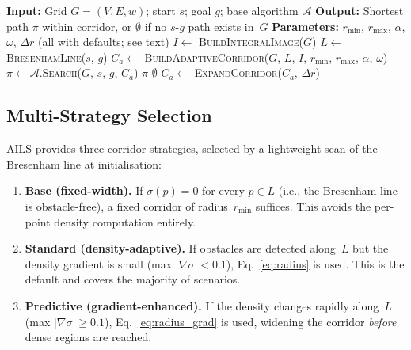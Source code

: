 \documentclass[journal]{IEEEtran}
\begin{document}
\begin{algorithm}[h]
\caption{AILS-Enhanced Pathfinding}
\label{alg:ails}
\begin{algorithmic}[1]
\STATE \textbf{Input:} Grid $G=(V,E,w)$; start $s$; goal $g$; base algorithm $\mathcal{A}$
\STATE \textbf{Output:} Shortest path $\pi$ within corridor, or $\emptyset$ if no $s$-$g$ path exists in~$G$
\STATE \textbf{Parameters:} $r_{\min}$, $r_{\max}$, $\alpha$, $\omega$, $\Delta r$ (all with defaults; see text)
\STATE
\STATE $I \leftarrow$ \textsc{BuildIntegralImage}($G$) 
\STATE $L \leftarrow$ \textsc{BresenhamLine}($s$, $g$) 
\STATE $C_a \leftarrow$ \textsc{BuildAdaptiveCorridor}($G$, $L$, $I$, $r_{\min}$, $r_{\max}$, $\alpha$, $\omega$)
\STATE
\REPEAT
    \STATE $\pi \leftarrow \mathcal{A}$.\textsc{Search}($G$, $s$, $g$, $C_a$) 
    \IF{$\pi \neq \emptyset$}
        \RETURN $\pi$
    \ENDIF
        \RETURN $\emptyset$ 
    \ENDIF
    \STATE $C_a \leftarrow$ \textsc{ExpandCorridor}($C_a$, $\Delta r$) 
\end{algorithmic}
\end{algorithm}

\subsection{Multi-Strategy Selection}
\label{sec:strategy}

AILS provides three corridor strategies, selected by a lightweight scan of the Bresenham line at initialisation:

\begin{enumerate}
    \item \textbf{Base (fixed-width).}
    If $\sigma(p) = 0$ for every $p \in L$ (i.e., the Bresenham line is obstacle-free), a fixed corridor of radius~$r_{\min}$ suffices.
    This avoids the per-point density computation entirely.

    \item \textbf{Standard (density-adaptive).}
    If obstacles are detected along~$L$ but the density gradient is small (max $|\nabla\sigma| < 0.1$), Eq.~\ref{eq:radius} is used.
    This is the default and covers the majority of scenarios.

    \item \textbf{Predictive (gradient-enhanced).}
    If the density changes rapidly along~$L$ (max $|\nabla\sigma| \geq 0.1$), Eq.~\ref{eq:radius_grad} is used, widening the corridor \emph{before} dense regions are reached.
\end{enumerate}
\end{document}
